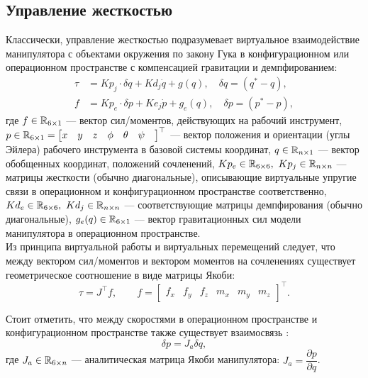 \subsection{Управление жесткостью}
Классически, управление жесткостью подразумевает виртуальное взаимодействие манипулятора с объектами окружения по закону Гука \cite{Siciliano2000} в конфигурационном или операционном  пространстве с компенсацией гравитации и демпфированием:
\begin{align}
  \tau &= Kp_{j}\cdot  \delta q + Kd_{j}\dot{q} + g(q), \quad \delta q = (q^* - q),   \label{eq:stiffnes_base_1}\\
  f &= Kp_{e}\cdot \delta p + Ke_{j}\dot{p} + g_e(q), \quad \delta p = (p^* - p), \label{eq:stiffnes_base_2}
\end{align}
где $f \in \mathbb{R}_{6 \times 1}$ --- вектор сил/моментов, действующих на рабочий инструмент, $p \in \mathbb{R}_{6 \times 1} = \displaystyle \begin{bmatrix} x& y& z& \phi& \theta& \psi& \end{bmatrix}^\top$ --- вектор положения и ориентации (углы Эйлера) рабочего инструмента в базовой системы координат, $q \in \mathbb{R}_{n \times1}$ --- вектор обобщенных координат, положений сочленений, $Kp_{e} \in \mathbb{R}_{6 \times 6},\ Kp_{j} \in \mathbb{R}_{n \times n}$ --- матрицы жесткости (обычно диагональные), описывающие виртуальные упругие связи в операционном и конфигурационном пространстве соответственно, $Kd_{e} \in \mathbb{R}_{6 \times 6},\ Kd_{j} \in \mathbb{R}_{n \times n}$ --- соответствующие матрицы демпфирования (обычно диагональные), $g_e(q) \in \mathbb{R}_{6 \times 1}$ --- вектор гравитационных сил модели манипулятора в операционном пространстве.\\

Из принципа виртуальной работы и виртуальных перемещений \cite{Spong2006} следует, что между вектором сил/моментов и вектором моментов на сочленениях существует геометрическое соотношение в виде матрицы Якоби:
\begin{equation}
  \tau = J^\top f, \qquad  f =\begin{bmatrix} f_x& f_y & f_z & m_x & m_y & m_z\end{bmatrix}^\top.
  \label{eq:Tvsf}
\end{equation}

Стоит отметить, что между скоростями в операционном пространстве и конфигурационном пространстве также существует взаимосвязь \cite{Handbook}:
\begin{equation}
  \delta p = J_a \delta q,
  \label{eq:Ja_def}
\end{equation}
где $J_a \in \mathbb{R}_{6 \times n}$ --- аналитическая матрица Якоби манипулятора: $J_a = \dfrac{\partial p}{\partial q}$.\\


